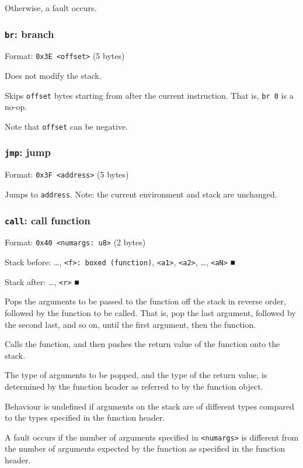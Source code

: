 Otherwise, a fault occurs.

\subsubsection{\texttt{br}: branch}
\label{sec:org71bb9a3}
Format: \texttt{0x3E <offset>} (5 bytes)

Does not modify the stack.

Skips \texttt{offset} bytes starting from after the current instruction. That
is, \texttt{br 0} is a no-op.

Note that \texttt{offset} can be negative.

\subsubsection{\texttt{jmp}: jump}
\label{sec:orgeb956da}
Format: \texttt{0x3F <address>} (5 bytes)

Jumps to \texttt{address}. Note: the current environment and stack are
unchanged.

\subsubsection{\texttt{call}: call function}
\label{sec:orgc60978b}
Format: \texttt{0x40 <numargs: u8>} (2 bytes)

Stack before: \ldots{}​, \texttt{<f>: boxed (function)}, \texttt{<a1>}, \texttt{<a2>}, \ldots{}​,
\texttt{<aN>} ■

Stack after: \ldots{}​, \texttt{<r>} ■

Pops the arguments to be passed to the function off the stack in reverse
order, followed by the function to be called. That is, pop the last
argument, followed by the second last, and so on, until the first
argument, then the function.

Calls the function, and then pushes the return value of the function
onto the stack.

The type of arguments to be popped, and the type of the return value, is
determined by the function header as referred to by the function object.

Behaviour is undefined if arguments on the stack are of different types
compared to the types specified in the function header.

A fault occurs if the number of arguments specified in \texttt{<numargs>} is
different from the number of arguments expected by the function as
specified in the function header.

